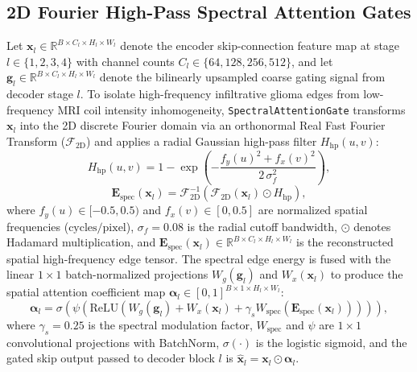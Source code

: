 \documentclass[journal,onecolumn,10pt]{IEEEtran}
\begin{document}
\subsection{2D Fourier High-Pass Spectral Attention Gates}
Let $\mathbf{x}_l \in \mathbb{R}^{B \times C_l \times H_l \times W_l}$ denote the encoder skip-connection feature map at stage $l \in \{1, 2, 3, 4\}$ with channel counts $C_l \in \{64, 128, 256, 512\}$, and let $\mathbf{g}_l \in \mathbb{R}^{B \times C_l \times H_l \times W_l}$ denote the bilinearly upsampled coarse gating signal from decoder stage $l$. To isolate high-frequency infiltrative glioma edges from low-frequency MRI coil intensity inhomogeneity, \texttt{SpectralAttentionGate} transforms $\mathbf{x}_l$ into the 2D discrete Fourier domain via an orthonormal Real Fast Fourier Transform ($\mathcal{F}_{\text{2D}}$) and applies a radial Gaussian high-pass filter $H_{\text{hp}}(u,v)$:
\begin{equation}
    H_{\text{hp}}(u,v) = 1 - \exp\!\left(-\frac{f_y(u)^2 + f_x(v)^2}{2\,\sigma_f^2}\right),
    \label{eq:fft_hp}
\end{equation}
\begin{equation}
    \mathbf{E}_{\text{spec}}(\mathbf{x}_l) = \mathcal{F}_{\text{2D}}^{-1}\!\left(\mathcal{F}_{\text{2D}}(\mathbf{x}_l) \odot H_{\text{hp}}\right),
    \label{eq:fft_edges}
\end{equation}
where $f_y(u) \in [-0.5, 0.5)$ and $f_x(v) \in [0, 0.5]$ are normalized spatial frequencies ($\text{cycles/pixel}$), $\sigma_f = 0.08$ is the radial cutoff bandwidth, $\odot$ denotes Hadamard multiplication, and $\mathbf{E}_{\text{spec}}(\mathbf{x}_l) \in \mathbb{R}^{B \times C_l \times H_l \times W_l}$ is the reconstructed spatial high-frequency edge tensor. The spectral edge energy is fused with the linear $1\times 1$ batch-normalized projections $W_g(\mathbf{g}_l)$ and $W_x(\mathbf{x}_l)$ to produce the spatial attention coefficient map $\boldsymbol{\alpha}_l \in [0,1]^{B \times 1 \times H_l \times W_l}$:
\begin{equation}
    \boldsymbol{\alpha}_l = \sigma\!\left(\psi\!\left(\text{ReLU}\!\left(W_g(\mathbf{g}_l) + W_x(\mathbf{x}_l) + \gamma_s W_{\text{spec}}(\mathbf{E}_{\text{spec}}(\mathbf{x}_l))\right)\right)\right),
    \label{eq:spec_gate}
\end{equation}
where $\gamma_s = 0.25$ is the spectral modulation factor, $W_{\text{spec}}$ and $\psi$ are $1\times 1$ convolutional projections with BatchNorm, $\sigma(\cdot)$ is the logistic sigmoid, and the gated skip output passed to decoder block $l$ is $\hat{\mathbf{x}}_l = \mathbf{x}_l \odot \boldsymbol{\alpha}_l$.
\end{document}
